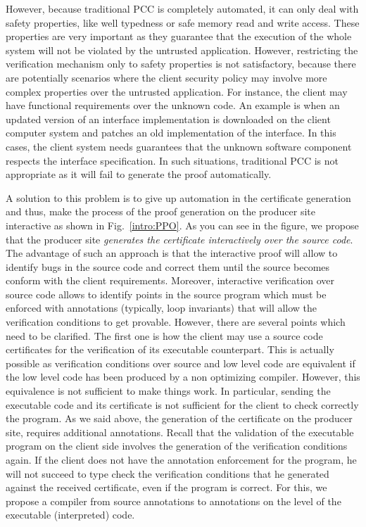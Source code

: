 However, because traditional PCC is completely automated, it can only deal with safety properties, like well typedness or safe memory read and write access.
These properties are very important as they guarantee that the execution of the whole system will not be violated by the untrusted application.
However, restricting the verification mechanism only to safety properties is not satisfactory, because there are 
potentially scenarios where the client security policy may involve more complex properties over the untrusted application.
For instance, the client may have functional requirements over the unknown code. An example is  when an updated version  of an interface   implementation
 is downloaded on the  client computer system and patches an old implementation of the interface. In this cases, the client system needs guarantees
 that the unknown software component respects the interface specification.
In such situations, traditional PCC is not appropriate as it will fail to generate the proof automatically. 


A solution to this problem is to give up automation in the certificate generation and thus, make the process of  the proof generation 
on the producer site interactive as shown in Fig.\ \ref{intro:PPO}. As you can see in the figure, we propose that  the producer site
 \textit{generates the certificate interactively over the source code}. The advantage of 
such an approach  is that the interactive proof will allow to identify bugs in the source code and
 correct them until the source becomes conform with the client  requirements. 
Moreover,  interactive verification over source code allows to identify  points in the source program which 
must be enforced with  annotations (typically, loop invariants)
 that will allow the verification conditions to get provable. 
However, there are several points which need to be clarified.
The first one is how the client may use a source code certificates for the verification of its executable counterpart.
This is actually possible as verification conditions over source and low level code are equivalent if the low level 
code has been produced by a non optimizing compiler. However, this equivalence is not sufficient to make things work.
In particular, sending the executable code and its certificate is not sufficient for the client to check correctly the program.
 As we said above, the generation of the certificate on the producer site, requires additional annotations.
 Recall that the validation of the executable program on the client side  involves the generation of the verification
 conditions again. If the client does not have the annotation enforcement for the program, he will not succeed to type
check the verification conditions that he generated against the received certificate, even if the program is correct. 
For this, we propose a compiler from source annotations to annotations on the level of the executable (interpreted) code.



